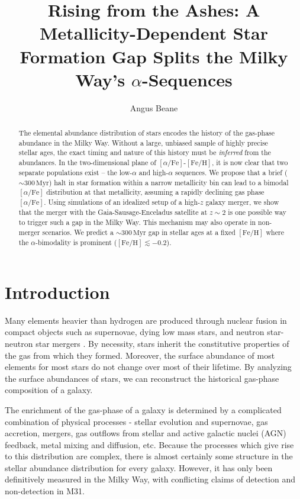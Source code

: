 \documentclass[twocolumn,linenumbers,trackchanges]{aastex631}
\newcommand{\Myr}{\ensuremath{\textrm{Myr}}}
\newcommand{\FeH}{\ensuremath{[\textrm{Fe}/\textrm{H}]}}
\newcommand{\alphaFe}{\ensuremath{[\alpha/\textrm{Fe}]}}
\begin{document}
\title{Rising from the Ashes: A Metallicity-Dependent Star Formation Gap Splits the Milky Way's $\alpha$-Sequences}

\author[0000-0002-8658-1453]{Angus Beane}

\begin{abstract}
    The elemental abundance distribution of stars encodes the history of the gas-phase abundance in the Milky Way. Without a large, unbiased sample of highly precise stellar ages, the exact timing and nature of this history must be \textit{inferred} from the abundances. In the two-dimensional plane of \alphaFe{}-\FeH{}, it is now clear that two separate populations exist -- the low-$\alpha$ and high-$\alpha$ sequences. We propose that a brief ($\sim300\,\Myr$) halt in star formation within a narrow metallicity bin can lead to a bimodal \alphaFe{} distribution at that metallicity, assuming a rapidly declining gas phase \alphaFe{}. Using simulations of an idealized setup of a high-$z$ galaxy merger, we show that the merger with the Gaia-Sausage-Enceladus satellite at $z\sim2$ is one possible way to trigger such a gap in the Milky Way. This mechanism may also operate in non-merger scenarios. We predict a $\sim300\,\Myr$ gap in stellar ages at a fixed \FeH{} where the $\alpha$-bimodality is prominent ($\FeH\lesssim-0.2$).
\end{abstract}
  

\section{Introduction} \label{sec:intro}
Many elements heavier than hydrogen are produced through nuclear fusion in compact objects such as supernovae, dying low mass stars, and neutron star-neutron star mergers \citep[e.g.][]{2023A&ARv..31....1A}. By necessity, stars inherit the constitutive properties of the gas from which they formed. Moreover, the surface abundance of most elements for most stars do not change over most of their lifetime. By analyzing the surface abundances of stars, we can reconstruct the historical gas-phase composition of a galaxy.

The enrichment of the gas-phase of a galaxy is determined by a complicated combination of physical processes - stellar evolution and supernovae, gas accretion, mergers, gas outflows from stellar and active galactic nuclei (AGN) feedback, metal mixing and diffusion, etc. Because the processes which give rise to this distribution are complex, there is almost certainly some structure in the stellar abundance distribution for every galaxy. However, it has only been definitively measured in the Milky Way, with conflicting claims of detection \citep{2023ApJ...956L..14K} and non-detection \citep{2024IAUS..377..115N} in M31.
\end{document}
